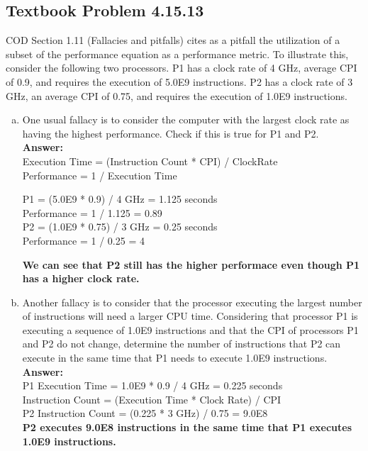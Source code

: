 \documentclass[12pt]{article}
\begin{document}
\subsection{Textbook Problem 4.15.13}
COD Section 1.11 (Fallacies and pitfalls) cites as a pitfall the utilization of a subset of the performance equation as a performance metric. To illustrate this, consider the following two processors. P1 has a clock rate of 4 GHz, average CPI of 0.9, and requires the execution of 5.0E9 instructions. P2 has a clock rate of 3 GHz, an average CPI of 0.75, and requires the execution of 1.0E9 instructions.
\begin{enumerate}[(a)]
    \item One usual fallacy is to consider the computer with the largest clock rate as having the highest performance. Check if this is true for P1 and P2.
    \\
    \textbf{Answer:}
    \\
    Execution Time = (Instruction Count * CPI) / ClockRate\\
    Performance = 1 / Execution Time
        \begin{center}
            P1 = (5.0E9 * 0.9) / 4 GHz = 1.125 seconds\\
            Performance = 1 / 1.125 = 0.89\\

            P2 = (1.0E9 * 0.75) / 3 GHz = 0.25 seconds\\
            Performance = 1 / 0.25 = 4\\
        \end{center}
        \textbf{We can see that P2 still has the higher performace even though P1 has a higher clock rate.}
    \item Another fallacy is to consider that the processor executing the largest number of instructions will need a larger CPU time. Considering that processor P1 is executing a sequence of 1.0E9 instructions and that the CPI of processors P1 and P2 do not change, determine the number of instructions that P2 can execute in the same time that P1 needs to execute 1.0E9 instructions.
    \\
    \textbf{Answer:}
    \\
    P1 Execution Time = 1.0E9 * 0.9 / 4 GHz = 0.225 seconds\\
    Instruction Count = (Execution Time * Clock Rate) / CPI\\
    P2 Instruction Count = (0.225 * 3 GHz) / 0.75 = 9.0E8\\
    \textbf{P2 executes 9.0E8 instructions in the same time that P1 executes 1.0E9 instructions.}
   

\end{enumerate}
\end{document}
